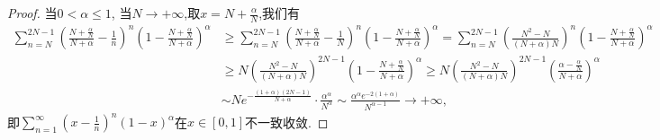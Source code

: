 \documentclass[../../main.tex]{subfiles}
\begin{document}
\begin{proof}
当$0<\alpha\leqslant1$, 当$N\to+\infty$,取$x=N+\frac{\alpha}{N}$,我们有
$$
\begin{aligned}
\sum_{n=N}^{2N-1}{\left( \frac{N+\frac{\alpha}{N}}{N+\alpha}-\frac{1}{n} \right) ^n\left( 1-\frac{N+\frac{\alpha}{N}}{N+\alpha} \right) ^{\alpha}}&\geqslant \sum_{n=N}^{2N-1}{\left( \frac{N+\frac{\alpha}{N}}{N+\alpha}-\frac{1}{N} \right) ^n\left( 1-\frac{N+\frac{\alpha}{N}}{N+\alpha} \right) ^{\alpha}}
=\sum_{n=N}^{2N-1}{\left( \frac{N^2-N}{(N+\alpha )N} \right) ^n\left( 1-\frac{N+\frac{\alpha}{N}}{N+\alpha} \right) ^{\alpha}}
\\
&\geqslant N\left( \frac{N^2-N}{(N+\alpha )N} \right) ^{2N-1}\left( 1-\frac{N+\frac{\alpha}{N}}{N+\alpha} \right) ^{\alpha}
\geqslant N\left( \frac{N^2-N}{(N+\alpha )N} \right) ^{2N-1}\left( \frac{\alpha -\frac{\alpha}{N}}{N+\alpha} \right) ^{\alpha}
\\
&\sim Ne^{-\frac{\left( 1+\alpha \right) \left( 2N-1 \right)}{N+\alpha}}\cdot \frac{\alpha ^{\alpha}}{N^{\alpha}}\sim \frac{\alpha ^{\alpha}e^{-2\left( 1+\alpha \right)}}{N^{\alpha -1}}\rightarrow +\infty ,
\end{aligned}
$$
即$\sum\limits_{n=1}^{\infty}\left(x-\frac{1}{n}\right)^n(1-x)^\alpha$在$x\in[0,1]$不一致收敛.

\end{proof}
\end{document}
